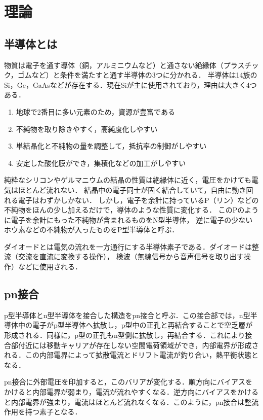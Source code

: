 \section{理論}
\subsection{半導体とは}

物質は電子を通す導体（銅，アルミニウムなど）と通さない絶縁体（プラスチック，ゴムなど）と条件を満たすと通す半導体の3つに分かれる．
半導体は14族のSi，Ge，GaAsなどが存在する．現在Siが主に使用されており，理由は大きく4つある．
\begin{enumerate}
    \item 地球で2番目に多い元素のため，資源が豊富である
    \item 不純物を取り除きやすく，高純度化しやすい
    \item 単結晶化と不純物の量を調整して，抵抗率の制御がしやすい
    \item 安定した酸化膜ができ，集積化などの加工がしやすい
\end{enumerate}

純粋なシリコンやゲルマニウムの結晶の性質は絶縁体に近く，電圧をかけても電気はほとんど流れない．
結晶中の電子同士が固く結合していて，自由に動き回れる電子はわずかしかない．
しかし，電子を余計に持っているP（リン）などの不純物をほんの少し加えるだけで，導体のような性質に変化する．
このPのように電子を余計にもった不純物が含まれるものをN型半導体，
逆に電子の少ないホウ素などの不純物が入ったものをP型半導体と呼ぶ．

ダイオードとは電気の流れを一方通行にする半導体素子である．ダイオードは整流（交流を直流に変換する操作），
検波（無線信号から音声信号を取り出す操作）などに使用される．

\subsection{pn接合}

p型半導体とn型半導体を接合した構造をpn接合と呼ぶ．この接合部では，n型半導体中の電子がp型半導体へ拡散し，p型中の正孔と再結合することで空乏層が形成される．同様に，p型の正孔もn型側に拡散し，再結合する．これにより接合部付近には移動キャリアが存在しない空間電荷領域ができ，内部電界が形成される．この内部電界によって拡散電流とドリフト電流が釣り合い，熱平衡状態となる．

pn接合に外部電圧を印加すると，このバリアが変化する．順方向にバイアスをかけると内部電界が弱まり，電流が流れやすくなる．逆方向にバイアスをかけると内部電界が強まり，電流はほとんど流れなくなる．このように，pn接合は整流作用を持つ素子となる．


